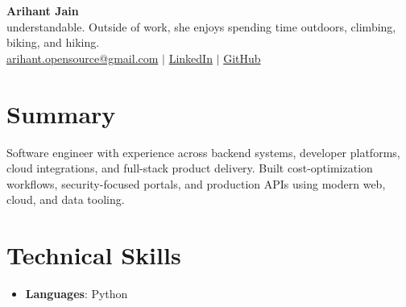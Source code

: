 \documentclass[11pt,a4paper]{article}
\begin{document}
\begin{center}
{\LARGE \textbf{Arihant Jain}}
\\ understandable. Outside of work, she enjoys spending time outdoors, climbing, biking, and hiking.
\\ \href{mailto:arihant.opensource@gmail.com}{arihant.opensource@gmail.com} $\mid$ \href{https://linkedin.com/in/arihantjain1208}{LinkedIn} $\mid$ \href{https://github.com/Arihant1208}{GitHub}
\end{center}

\section{Summary}
Software engineer with experience across backend systems, developer platforms, cloud integrations, and full-stack product delivery. Built cost-optimization workflows, security-focused portals, and production APIs using modern web, cloud, and data tooling.

\section{Technical Skills}
\begin{itemize}
  \item \textbf{Languages}: Python
\end{itemize}
\end{document}

